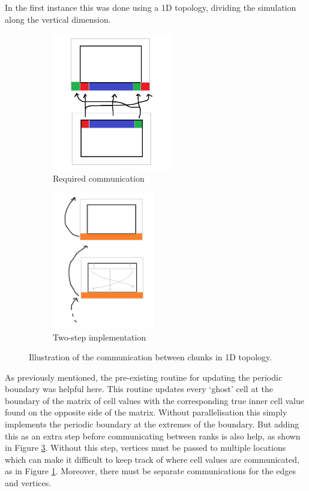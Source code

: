 \documentclass[12pt]{article}
\begin{document}
In the first instance this was done using a 1D topology, dividing the simulation along the vertical dimension.

\begin{figure}[hp]
    \begin{subfigure}{0.49\textwidth}
    \includegraphics[width=0.9\linewidth, height=6cm, center]{figures/domain_decomp_1d_1.png}
    \caption{Required communication}
    \label{fig:domain_1d_1}
    \end{subfigure}
    \begin{subfigure}{0.49\textwidth}
    \includegraphics[width=0.9\linewidth, height=6cm, center]{figures/domain_decomp_1d_2.png}
    \caption{Two-step implementation}
    \label{fig:domain_1d_2}
    \end{subfigure}

    \caption{Illustration of the communication between chunks in 1D topology.}
    \label{fig:domain_1d}
\end{figure}

As previously mentioned, the pre-existing routine for updating the periodic boundary was helpful here.
This routine updates every `ghost' cell at the boundary of the matrix of cell values with the corresponding true inner cell value found on the opposite side of the matrix.
Without parallelisation this simply implements the periodic boundary at the extremes of the boundary.
But adding this as an extra step before communicating between ranks is also help, as shown in Figure \ref{fig:domain_1d}.
Without this step, vertices must be passed to multiple locations which can make it difficult to keep track of where cell values are communicated, as in Figure \ref{fig:domain_1d_1}.
Moreover, there must be separate communications for the edges and vertices.
\end{document}
